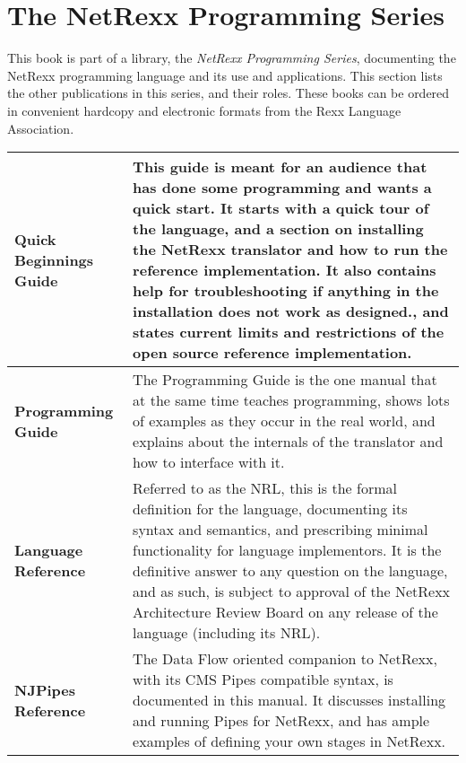 \chapter{The NetRexx Programming Series}
This book is part of a library, the \emph{NetRexx Programming Series}, documenting the NetRexx programming language and its use and applications. This section lists the other publications in this series, and their roles. These books can be ordered in convenient hardcopy and electronic formats from the Rexx Language Association.
\newline
\newline
\newline
\begin{tabularx}{\textwidth}{>{\bfseries}lX}
\toprule
Quick Beginnings Guide & This guide is meant for an audience that has done some programming and wants a quick start. It starts with a quick tour of the language, and a section on installing the NetRexx translator and how to run the reference implementation. It also contains help for troubleshooting if anything in the installation does not work as designed., and states current limits and restrictions of the open source reference implementation.
\\\midrule
Programming Guide & The Programming Guide is the one manual that at the same time teaches programming, shows lots of examples as they occur in the real world, and explains about the internals of the translator and how to interface with it.
\\\midrule
Language Reference & Referred to as the NRL, this is the formal definition for the language, documenting its syntax and semantics, and prescribing minimal functionality for language implementors. It is the definitive answer to any question on the language, and as such, is subject to approval of the NetRexx Architecture Review Board on any release of the language (including its NRL).
\\\midrule
NJPipes Reference & The Data Flow oriented companion to NetRexx, with its CMS Pipes compatible syntax, is documented in this manual. It discusses installing and running Pipes for NetRexx, and has ample examples of defining your own stages in NetRexx.
\\\bottomrule
\end{tabularx}

